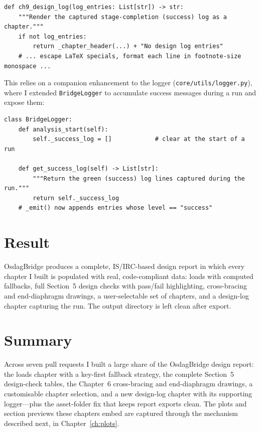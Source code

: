 \begin{lstlisting}[caption={The new design-log chapter (\texttt{report\_generator.py}).},label={lst:designlog}]
def ch9_design_log(log_entries: List[str]) -> str:
    """Render the captured stage-completion (success) log as a chapter."""
    if not log_entries:
        return _chapter_header(...) + "No design log entries"
    # ... escape LaTeX specials, format each line in footnote-size monospace ...
\end{lstlisting}

This relies on a companion enhancement to the logger (\texttt{core/utils/logger.py}), where I
extended \texttt{BridgeLogger} to accumulate success messages during a run and expose them:

\begin{lstlisting}[caption={Capturing success messages in the logger (\texttt{logger.py}).},label={lst:logger}]
class BridgeLogger:
    def analysis_start(self):
        self._success_log = []            # clear at the start of a run

    def get_success_log(self) -> List[str]:
        """Return the green (success) log lines captured during the run."""
        return self._success_log
    # _emit() now appends entries whose level == "success"
\end{lstlisting}

\section{Result}
OsdagBridge produces a complete, IS/IRC-based design report in which every chapter I built is
populated with real, code-compliant data: loads with computed fallbacks, full Section~5 design
checks with pass/fail highlighting, cross-bracing and end-diaphragm drawings, a user-selectable
set of chapters, and a design-log chapter capturing the run. The output directory is left clean
after export.




\section{Summary}
Across seven pull requests I built a large share of the OsdagBridge design report: the loads
chapter with a key-first fallback strategy, the complete Section~5 design-check tables, the
Chapter~6 cross-bracing and end-diaphragm drawings, a customisable chapter selection, and a new
design-log chapter with its supporting logger---plus the asset-folder fix that keeps report
exports clean. The plots and section previews these chapters embed are captured through the
mechanism described next, in Chapter~\ref{ch:plots}.
